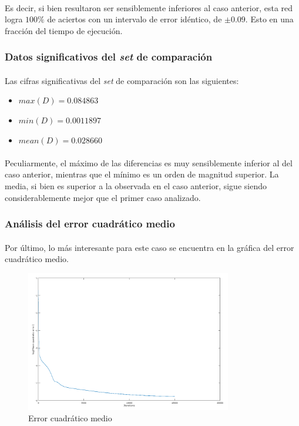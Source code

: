 \documentclass[12pt, twocolumn]{article}
\begin{document}
	\paragraph{} Es decir, si bien resultaron ser sensiblemente inferiores al caso anterior, esta red logra $100\%$ de aciertos con un intervalo de error idéntico, de $\pm 0.09$. Esto en una fracción del tiempo de ejecución.
	
	\subsubsection{Datos significativos del \textit{set} de comparación}
	
	\paragraph{} Las cifras significativas del \textit{set} de comparación son las siguientes:
	
	\begin{itemize}
		\item $max(D) = 0.084863$
		\item $min(D) = 0.0011897$
		\item $mean(D) = 0.028660$
	\end{itemize} 
	
	\paragraph{} Peculiarmente, el máximo de las diferencias es muy sensiblemente inferior al del caso anterior, mientras que el mínimo es un orden de magnitud superior. La media, si bien es superior a la observada en el caso anterior, sigue siendo considerablemente mejor que el primer caso analizado. 
	
	\subsubsection{Análisis del error cuadrático medio}
	
	\paragraph{} Por último, lo más interesante para este caso se encuentra en la gráfica del error cuadrático medio. 
	
	\begin{figure}[H]
		\centering
		\includegraphics[width=9cm]{../results/batch_variable/1/log_batch.png}
		\caption{Error cuadrático medio}
		\label{error3}
	\end{figure}
	
\end{document}

